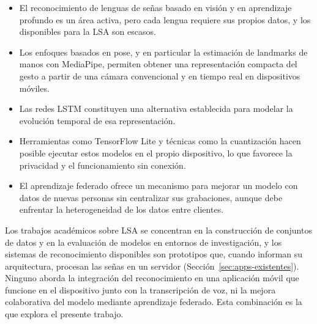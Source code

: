 \begin{itemize}
    \item El reconocimiento de lenguas de señas basado en visión y en aprendizaje profundo es un área activa, pero cada lengua requiere sus propios datos, y los disponibles para la LSA son escasos.
    \item Los enfoques basados en pose, y en particular la estimación de landmarks de manos con MediaPipe, permiten obtener una representación compacta del gesto a partir de una cámara convencional y en tiempo real en dispositivos móviles.
    \item Las redes LSTM constituyen una alternativa establecida para modelar la evolución temporal de esa representación.
    \item Herramientas como TensorFlow Lite y técnicas como la cuantización hacen posible ejecutar estos modelos en el propio dispositivo, lo que favorece la privacidad y el funcionamiento sin conexión.
    \item El aprendizaje federado ofrece un mecanismo para mejorar un modelo con datos de nuevas personas sin centralizar sus grabaciones, aunque debe enfrentar la heterogeneidad de los datos entre clientes.
\end{itemize}

Los trabajos académicos sobre LSA se concentran en la construcción de conjuntos de datos y en la evaluación de modelos en entornos de investigación, y los sistemas de reconocimiento disponibles son prototipos que, cuando informan su arquitectura, procesan las señas en un servidor (Sección~\ref{sec:apps-existentes}). Ninguno aborda la integración del reconocimiento en una aplicación móvil que funcione en el dispositivo junto con la transcripción de voz, ni la mejora colaborativa del modelo mediante aprendizaje federado. Esta combinación es la que explora el presente trabajo.
